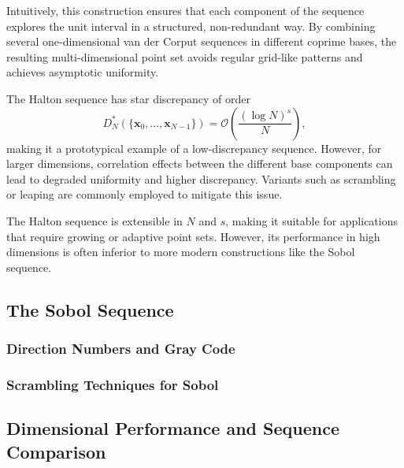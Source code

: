 Intuitively, this construction ensures that each component of the sequence explores the unit interval in a structured, non-redundant way. By combining several one-dimensional van der Corput sequences in different coprime bases, the resulting multi-dimensional point set avoids regular grid-like patterns and achieves asymptotic uniformity.

The Halton sequence has star discrepancy of order
\begin{equation*}
    D_N^*(\{\boldsymbol{x}_0, \dots, \boldsymbol{x}_{N-1}\}) = \mathcal{O}\left( \frac{(\log N)^s}{N} \right),
\end{equation*}
making it a prototypical example of a low-discrepancy sequence. However, for
larger dimensions, correlation effects between the different base components can
lead to degraded uniformity and higher discrepancy. Variants such as scrambling
or leaping are commonly employed to mitigate this issue.

\begin{remark}
The Halton sequence is extensible in $N$ and $s$, making it suitable for
applications that require growing or adaptive point sets. However, its
performance in high dimensions is often inferior to more modern constructions
like the Sobol sequence.
\end{remark}


  \subsection{The Sobol Sequence}



    \subsubsection{Direction Numbers and Gray Code}



    \subsubsection{Scrambling Techniques for Sobol}



  \subsection{Dimensional Performance and Sequence Comparison}
